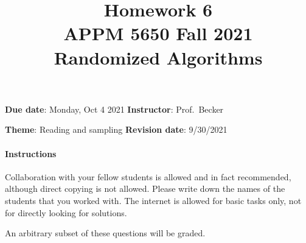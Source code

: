 \documentclass[10pt, letterpaper]{scrartcl}
\title{Homework 6 \solTitle{Selected Solutions} \\APPM 5650 Fall 2021 \\ Randomized Algorithms}
\date{}
\newenvironment{instructions}{}{}
\begin{document}
\maketitle
\vspace{-6em}
\textbf{\sffamily Due date}: Monday, Oct 4 2021
\hfill \textbf{\sffamily Instructor}: Prof.\ Becker

\textbf{\sffamily Theme}: Reading and sampling
\hfill \textbf{\sffamily Revision date}: 9/30/2021

\begin{instructions}
\paragraph{Instructions}
Collaboration with your fellow students is allowed and in fact recommended, although direct copying is not allowed.  Please write down the names of the students that you worked with. The internet is allowed for basic tasks only, not for directly looking for solutions.

An arbitrary subset of these questions will be graded.

%
%
\end{instructions}
\end{document}
